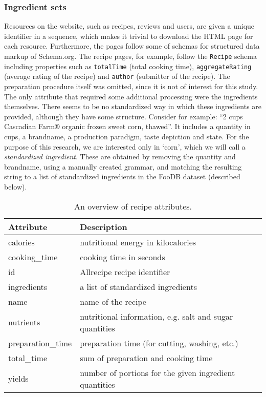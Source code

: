 

\subsubsection{Ingredient sets}
\label{subsubsec:ingredient_sets}

Resources on the website, such as recipes, reviews and users, are given a unique identifier in a sequence, which makes it trivial to download the HTML page for each resource.
Furthermore, the pages follow some of schemas for structured data markup of Schema.org.
The recipe pages, for example, follow the \texttt{Recipe} schema including properties such as \texttt{totalTime} (total cooking time), \texttt{aggregateRating} (average rating of the recipe) and \texttt{author} (submitter of the recipe).
The preparation procedure itself was omitted, since it is not of interest for this study.
The only attribute that required some additional processing were the ingredients themselves.
There seems to be no standardized way in which these ingredients are provided, although they have some structure.
Consider for example: ``2 cups Cascadian Farm® organic frozen sweet corn, thawed''.
It includes a quantity in cups, a brandname, a production paradigm, taste depiction and state.
For the purpose of this research, we are interested only in `corn', which we will call a \emph{standardized ingredient}.
These are obtained by removing the quantity and brandname, using a manually created grammar, and matching the resulting string to a list of standardized ingredients in the FooDB dataset (described below).

\begin{table}[htbp]
	\caption{An overview of recipe attributes.}
	\label{tab:recipe_attributes}
	
	\centering
	\begin{tabular}{l l}
		\toprule
		\textbf{Attribute} & \textbf{Description} \\
		\midrule
		calories & nutritional energy in kilocalories \\
 		cooking\_time & cooking time in seconds \\
 		id & Allrecipe recipe identifier \\
 		ingredients & a list of standardized ingredients \\
 		name & name of the recipe \\
 		nutrients & nutritional information, e.g. salt and sugar quantities \\
 		preparation\_time & preparation time (for cutting, washing, etc.) \\
 		total\_time & sum of preparation and cooking time \\
 		yields & number of portions for the given ingredient quantities \\
 	\bottomrule
	\end{tabular}
\end{table}

